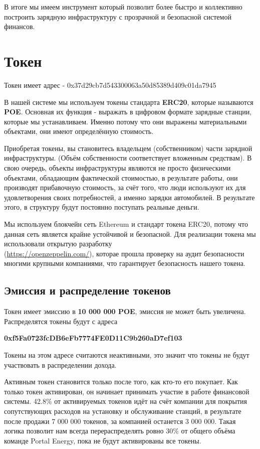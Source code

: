 \documentclass[a4paper,12pt]{report}
\newcommand{\contractAddress}{0x37d29cb7d543300063a50d85389d409c01da7945}
\begin{document}
В итоге мы имеем инструмент который позволит более быстро и коллективно построить зарядную инфраструктуру с прозрачной и безопасной системой финансов.

\section{Токен}

Токен имеет адрес - \contractAddress 

В нашей системе мы используем токены стандарта \textbf{ERC20}, которые называются \textbf{POE}. Основная их функция - выражать в цифровом формате зарядные станции, которые мы устанавливаем. Именно потому что они выражены материальными объектами, они имеют
определённую стоимость.

Приобретая токены, вы становитесь владельцем (собственником) части зарядной инфраструктуры. (Объём собственности соответствует вложенным средствам). В свою очередь, объекты инфраструктуры являются не просто физическими объектами, обладающим фактической стоимостью, в результате работы, они производят прибавочную стоимость, за счёт того, что люди используют их для удовлетворения своих потребностей, а именно зарядки автомобилей. В результате этого, в структуру будут постоянно поступать реальные деньги.

Мы используем блокчейн сеть Ethereum и стандарт токена ERC20, потому что данная сеть является крайне устойчивой и безопасной.
Для реализации токена мы использовали открытую разработку \\ (\href{https://openzeppelin.com/}{https://openzeppelin.com/}), которае прошла проверку на аудит безопасности многими крупными компаниями, что гарантирует безопасность нашего токена.


\subsection{Эмиссия и распределение токенов}

Токен имеет эмиссию в \textbf{10 000 000 POE}, эмиссия не может быть увеличена. Распределятся токены будут с адреса 

\textbf{0xf5Fa0723fcDB6eFb7774FE0D11C9b260aD7ef103}

Токены на этом адресе считаются неактивными, это значит что токены не будут участвовать в распределении дохода.  

Активным токен становится только после того, как кто-то его покупает. Как только токен активирован, он начинает принимать участие в работе финансовой системы. 
42.8\% от активируемых токенов идёт на счёт компании для покрытия сопутствующих расходов на установку и обслуживание станций, в результате после продажи 7 000 000 токенов, за компанией останется 3 000 000. Такая логика позволит нам всегда перераспределять ровно 30\% от общего объёма команде Portal Energy, пока не будут активированы все токены.
\end{document}

